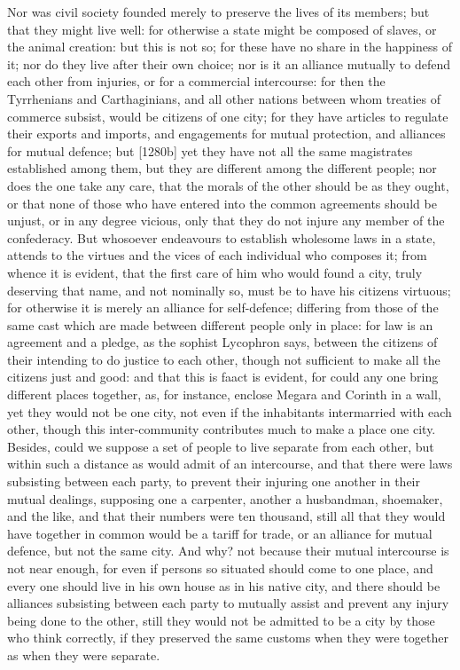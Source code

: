 Nor was civil society founded merely to preserve the lives of its members;
but that they might live well: for otherwise a state might be composed of
slaves, or the animal creation: but this is not so; for these have no
share in the happiness of it; nor do they live after their own choice; nor
is it an alliance mutually to defend each other from injuries, or for a
commercial intercourse: for then the Tyrrhenians and Carthaginians, and
all other nations between whom treaties of commerce subsist, would be
citizens of one city; for they have articles to regulate their exports and
imports, and engagements for mutual protection, and alliances for mutual
defence; but [1280b] yet they have not all the same magistrates
established among them, but they are different among the different people;
nor does the one take any care, that the morals of the other should be as
they ought, or that none of those who have entered into the common
agreements should be unjust, or in any degree vicious, only that they do
not injure any member of the confederacy. But whosoever endeavours to
establish wholesome laws in a state, attends to the virtues and the vices
of each individual who composes it; from whence it is evident, that the
first care of him who would found a city, truly deserving that name, and
not nominally so, must be to have his citizens virtuous; for otherwise it
is merely an alliance for self-defence; differing from those of the same
cast which are made between different people only in place: for law is an
agreement and a pledge, as the sophist Lycophron says, between the
citizens of their intending to do justice to each other, though not
sufficient to make all the citizens just and good: and that this is faact
is evident, for could any one bring different places together, as, for
instance, enclose Megara and Corinth in a wall, yet they would not be one
city, not even if the inhabitants intermarried with each other, though
this inter-community contributes much to make a place one city. Besides,
could we suppose a set of people to live separate from each other, but
within such a distance as would admit of an intercourse, and that there
were laws subsisting between each party, to prevent their injuring one
another in their mutual dealings, supposing one a carpenter, another a
husbandman, shoemaker, and the like, and that their numbers were ten
thousand, still all that they would have together in common would be a
tariff for trade, or an alliance for mutual defence, but not the same
city. And why? not because their mutual intercourse is not near enough,
for even if persons so situated should come to one place, and every one
should live in his own house as in his native city, and there should be
alliances subsisting between each party to mutually assist and prevent any
injury being done to the other, still they would not be admitted to be a
city by those who think correctly, if they preserved the same customs when
they were together as when they were separate.

